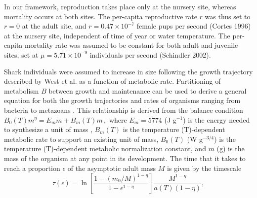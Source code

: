 \documentclass[]{rsos}%
\begin{document}
In our framework, reproduction takes place only at the nursery site, whereas mortality occurs at both sites.
The per-capita reproductive rate $r$ was thus set to $r=0$ at the adult site, and $r = 0.47 \times 10^{-7}$ female pups per second (Cortes 1996) at the nursery site, independent of time of year or water temperature. 
The per-capita mortality rate was assumed to be constant for both adult and juvenile sites, set at $\mu = 5.71 \times 10^{-9}$ individuals per second (Schindler 2002).

Shark individuals were assumed to increase in size following the growth trajectory described by West et al. \cite{West:2001bv} as a function of metabolic rate.
Partitioning of metabolism $B$ between growth and maintenance can be used to derive a general equation for both the
growth trajectories and rates of organisms ranging from bacteria to
metazoans
\cite{West:2001bv,moses2008rmo,gillooly2002esa,hou,Kempes:2012hy}. 
This relationship is derived from the balance condition 
$B_{0}(T)m^{\eta}=E_{m}\dot{m}+B_{m}(T)m\,,$
\cite{West:2001bv,moses2008rmo,gillooly2002esa,hou,Kempes:2012hy} where $E_{m} = 5774$ (J g${}^{-1}$) is the energy needed to synthesize a unit of mass \cite{moses2008rmo,hou,Pirt1965,Heijnen1981}, $B_{m}(T)$ is the temperature (T)-dependent metabolic rate to support an existing unit of mass, $B_0(T)$ (W g${}^{-3/4}$) is the temperature (T)-dependent metabolic normalization constant, and $m$ (g) is the mass of the organism at any point in its development.
The time that it takes to reach a proportion $\epsilon$ of the asymptotic adult mass $M$ is given by the timescale
\begin{equation}
\label{t1}
\tau\left(\epsilon\right) = \ln\left[\frac{1-\left(m_{0}/M\right)^{1-\eta}}{1-\epsilon^{1-\eta}}\right]\frac{M^{1-\eta}}{a(T)\left(1-\eta\right)},
\end{equation}
\end{document}

